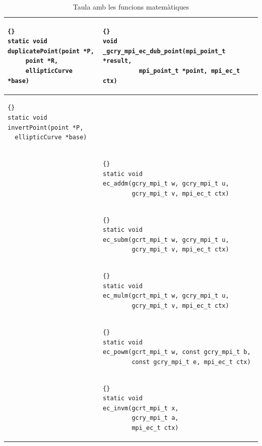 \documentclass[12pt,twoside,catalan,a4paper]{book}%
\numberwithin{figure}{section}		%
\theoremstyle{definition}   			%
\theoremstyle{saltolinea}   			%
\begin{document}
\begin{table}
\begin{center}
\begin{tabular}{|l|l|}
 \\
\hline
 {\tt \begin{lstlisting}{}
static void
duplicatePoint(point *P,
     point *R,
     ellipticCurve *base)
      \end{lstlisting} }
 &
 {\tt \begin{lstlisting}{}
void
_gcry_mpi_ec_dub_point(mpi_point_t *result,
          mpi_point_t *point, mpi_ec_t ctx)
      \end{lstlisting} }
 \\
\hline
 {\tt \begin{lstlisting}{}
static void
invertPoint(point *P,
  ellipticCurve *base)
      \end{lstlisting} }
 & \\
\hline
 &
 {\tt \begin{lstlisting}{}
static void
ec_addm(gcry_mpi_t w, gcry_mpi_t u,
        gcry_mpi_t v, mpi_ec_t ctx)
      \end{lstlisting} }
 \\
\hline
 &
 {\tt \begin{lstlisting}{}
static void
ec_subm(gcrt_mpi_t w, gcry_mpi_t u,
        gcry_mpi_t v, mpi_ec_t ctx)
      \end{lstlisting} }
 \\
\hline
 &
 {\tt \begin{lstlisting}{}
static void
ec_mulm(gcrt_mpi_t w, gcry_mpi_t u,
        gcry_mpi_t v, mpi_ec_t ctx)
      \end{lstlisting} }
 \\
\hline
 &
 {\tt \begin{lstlisting}{}
static void
ec_powm(gcrt_mpi_t w, const gcry_mpi_t b,
        const gcry_mpi_t e, mpi_ec_t ctx)
      \end{lstlisting} }
 \\
\hline
 &
 {\tt \begin{lstlisting}{}
static void
ec_invm(gcrt_mpi_t x,
        gcry_mpi_t a,
        mpi_ec_t ctx)
      \end{lstlisting} }
 \\
\hline
\end{tabular}
\end{center}
 \caption{Taula amb les funcions matem\`atiques\label{tab:math}}
\end{table}
\end{document}
